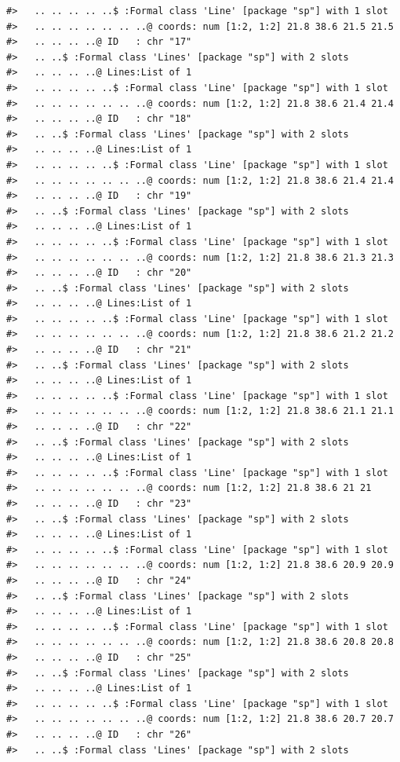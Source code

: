 \documentclass[12pt,a4paper,a4paper]{book}
\theoremstyle{definition}
\theoremstyle{definition}
\theoremstyle{definition}
\theoremstyle{remark}
\begin{document}
\begin{verbatim}
#>   .. .. .. .. ..$ :Formal class 'Line' [package "sp"] with 1 slot
#>   .. .. .. .. .. .. ..@ coords: num [1:2, 1:2] 21.8 38.6 21.5 21.5
#>   .. .. .. ..@ ID   : chr "17"
#>   .. ..$ :Formal class 'Lines' [package "sp"] with 2 slots
#>   .. .. .. ..@ Lines:List of 1
#>   .. .. .. .. ..$ :Formal class 'Line' [package "sp"] with 1 slot
#>   .. .. .. .. .. .. ..@ coords: num [1:2, 1:2] 21.8 38.6 21.4 21.4
#>   .. .. .. ..@ ID   : chr "18"
#>   .. ..$ :Formal class 'Lines' [package "sp"] with 2 slots
#>   .. .. .. ..@ Lines:List of 1
#>   .. .. .. .. ..$ :Formal class 'Line' [package "sp"] with 1 slot
#>   .. .. .. .. .. .. ..@ coords: num [1:2, 1:2] 21.8 38.6 21.4 21.4
#>   .. .. .. ..@ ID   : chr "19"
#>   .. ..$ :Formal class 'Lines' [package "sp"] with 2 slots
#>   .. .. .. ..@ Lines:List of 1
#>   .. .. .. .. ..$ :Formal class 'Line' [package "sp"] with 1 slot
#>   .. .. .. .. .. .. ..@ coords: num [1:2, 1:2] 21.8 38.6 21.3 21.3
#>   .. .. .. ..@ ID   : chr "20"
#>   .. ..$ :Formal class 'Lines' [package "sp"] with 2 slots
#>   .. .. .. ..@ Lines:List of 1
#>   .. .. .. .. ..$ :Formal class 'Line' [package "sp"] with 1 slot
#>   .. .. .. .. .. .. ..@ coords: num [1:2, 1:2] 21.8 38.6 21.2 21.2
#>   .. .. .. ..@ ID   : chr "21"
#>   .. ..$ :Formal class 'Lines' [package "sp"] with 2 slots
#>   .. .. .. ..@ Lines:List of 1
#>   .. .. .. .. ..$ :Formal class 'Line' [package "sp"] with 1 slot
#>   .. .. .. .. .. .. ..@ coords: num [1:2, 1:2] 21.8 38.6 21.1 21.1
#>   .. .. .. ..@ ID   : chr "22"
#>   .. ..$ :Formal class 'Lines' [package "sp"] with 2 slots
#>   .. .. .. ..@ Lines:List of 1
#>   .. .. .. .. ..$ :Formal class 'Line' [package "sp"] with 1 slot
#>   .. .. .. .. .. .. ..@ coords: num [1:2, 1:2] 21.8 38.6 21 21
#>   .. .. .. ..@ ID   : chr "23"
#>   .. ..$ :Formal class 'Lines' [package "sp"] with 2 slots
#>   .. .. .. ..@ Lines:List of 1
#>   .. .. .. .. ..$ :Formal class 'Line' [package "sp"] with 1 slot
#>   .. .. .. .. .. .. ..@ coords: num [1:2, 1:2] 21.8 38.6 20.9 20.9
#>   .. .. .. ..@ ID   : chr "24"
#>   .. ..$ :Formal class 'Lines' [package "sp"] with 2 slots
#>   .. .. .. ..@ Lines:List of 1
#>   .. .. .. .. ..$ :Formal class 'Line' [package "sp"] with 1 slot
#>   .. .. .. .. .. .. ..@ coords: num [1:2, 1:2] 21.8 38.6 20.8 20.8
#>   .. .. .. ..@ ID   : chr "25"
#>   .. ..$ :Formal class 'Lines' [package "sp"] with 2 slots
#>   .. .. .. ..@ Lines:List of 1
#>   .. .. .. .. ..$ :Formal class 'Line' [package "sp"] with 1 slot
#>   .. .. .. .. .. .. ..@ coords: num [1:2, 1:2] 21.8 38.6 20.7 20.7
#>   .. .. .. ..@ ID   : chr "26"
#>   .. ..$ :Formal class 'Lines' [package "sp"] with 2 slots

\end{verbatim}
\end{document}
